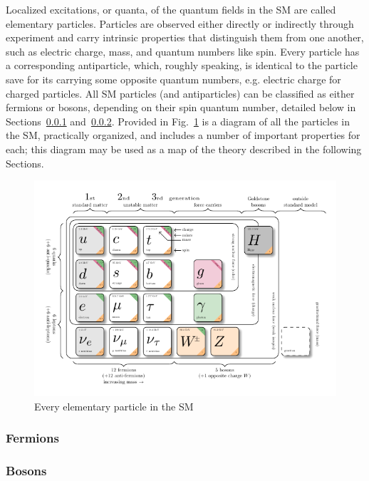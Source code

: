 Localized excitations, or quanta, of the quantum fields in the SM are called elementary particles. Particles are observed either directly or indirectly through experiment and carry intrinsic properties that distinguish them from one another, such as electric charge, mass, and quantum numbers like spin. Every particle has a corresponding antiparticle, which, roughly speaking, is identical to the particle save for its carrying some opposite quantum numbers, e.g. electric charge for charged particles. All SM particles (and antiparticles) can be classified as either fermions or bosons, depending on their spin quantum number, detailed below in Sections~\ref{sec:Fermions} and~\ref{sec:Bosons}. Provided in Fig.~\ref{fig:SM} is a diagram of all the particles in the SM, practically organized, and includes a number of important properties for each; this diagram may be used as a map of the theory described in the following Sections.

\begin{figure}[H]
    \centering
    \includegraphics[width=1\textwidth]{Images/model-physics.pdf}
    \caption{Every elementary particle in the SM}
    \label{fig:SM}
\end{figure}

\subsubsection{Fermions} \label{sec:Fermions}


\subsubsection{Bosons} \label{sec:Bosons}
